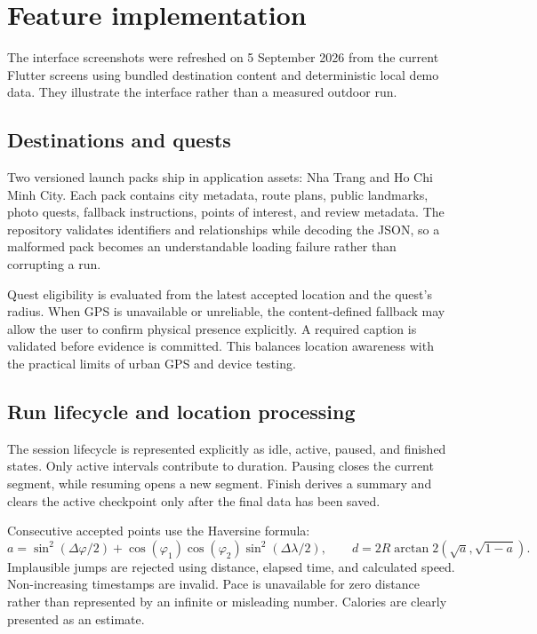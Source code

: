 \section{Feature implementation}

The interface screenshots were refreshed on 5 September 2026 from the current
Flutter screens using bundled destination content and deterministic local demo
data. They illustrate the interface rather than a measured outdoor run.

\subsection{Destinations and quests}
Two versioned launch packs ship in application assets: Nha Trang and Ho Chi Minh
City. Each pack contains city metadata, route plans, public landmarks, photo
quests, fallback instructions, points of interest, and review metadata. The
repository validates identifiers and relationships while decoding the JSON, so a
malformed pack becomes an understandable loading failure rather than corrupting
a run.

Quest eligibility is evaluated from the latest accepted location and the quest's
radius. When GPS is unavailable or unreliable, the content-defined fallback may
allow the user to confirm physical presence explicitly. A required caption is
validated before evidence is committed. This balances location awareness with
the practical limits of urban GPS and device testing.


\subsection{Run lifecycle and location processing}
The session lifecycle is represented explicitly as idle, active, paused, and
finished states. Only active intervals contribute to duration. Pausing closes the
current segment, while resuming opens a new segment. Finish derives a summary and
clears the active checkpoint only after the final data has been saved.

Consecutive accepted points use the Haversine formula:
\[
a=\sin^2(\Delta\varphi/2)+\cos(\varphi_1)\cos(\varphi_2)
  \sin^2(\Delta\lambda/2),\qquad
d=2R\arctan2(\sqrt a,\sqrt{1-a}).
\]
Implausible jumps are rejected using distance, elapsed time, and calculated
speed. Non-increasing timestamps are invalid. Pace is unavailable for zero
distance rather than represented by an infinite or misleading number. Calories
are clearly presented as an estimate.

